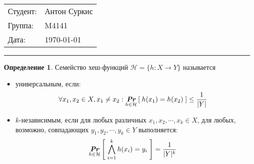 \documentclass{article}
\begin{document}
    \theoremstyle{definition}
    \newtheorem*{definition}{Определение}
    \newtheorem{theorem}{Теорема}
    \newtheorem{statement}{Утверждение}
    \newtheorem{lemma}{Лемма}

    \newcommand{\N}{\mathbb{N}}
    \newcommand{\R}{\mathbb{R}_{>0}}
    \renewcommand{\O}{\mathcal{O}}
    \renewcommand{\o}{o}
    \newcommand{\Const}{\mathit{Const}}
    \newcommand{\Mod}{~\text{mod}~}
    \newcommand{\thus}{\Rightarrow}
    \renewcommand{\H}{\mathcal{H}}
    \newcommand{\Prb}[1]{\underset{#1}{\textit{\textbf{Pr}}}}

    \newcommand{\paren}[1]{\left ( #1 \right )}
    \newcommand{\brackets}[1]{\left [ #1 \right ]}
    \newcommand{\braces}[1]{\left \{ #1 \right \}}
    \newcommand{\floor}[1]{\left \lfloor #1 \right \rfloor}
    \newcommand{\ceil}[1]{\left \lceil #1 \right \rceil}
    \newcommand{\abs}[1]{\left | #1 \right |}

    \hfill
    \begin{tabular}{ll}
        Студент: & Антон Суркис \\
        Группа:  & M4141        \\
        Дата:    & \today       \\
    \end{tabular}
    \hrule

    \begin{definition} Семейство хеш-функций $\H = \{ h : X \rightarrow Y \}$ называется
        \begin{itemize}
            \item универсальным, если:
            $$\forall x_1, x_2 \in X, x_1 \neq x_2: \Prb{h \in \H}\left[ \; h(x_1) = h(x_2) \; \right] \le \frac{1}{|Y|}$$

            \item $k$-независимым, если
            для любых различных $x_1, x_2, \cdots, x_k \in X$, для любых, возможно, совпадающих $y_1, y_2, \cdots, y_k \in Y$
            выполняется:
            $$\Prb{h \in \H}\left[ \; \bigwedge_{i=1}^k h(x_i) = y_i \; \right] = \frac{1}{|Y|^k}$$
        \end{itemize}
    \end{definition}

    
    
    
    
    
    
    
    
\end{document}
